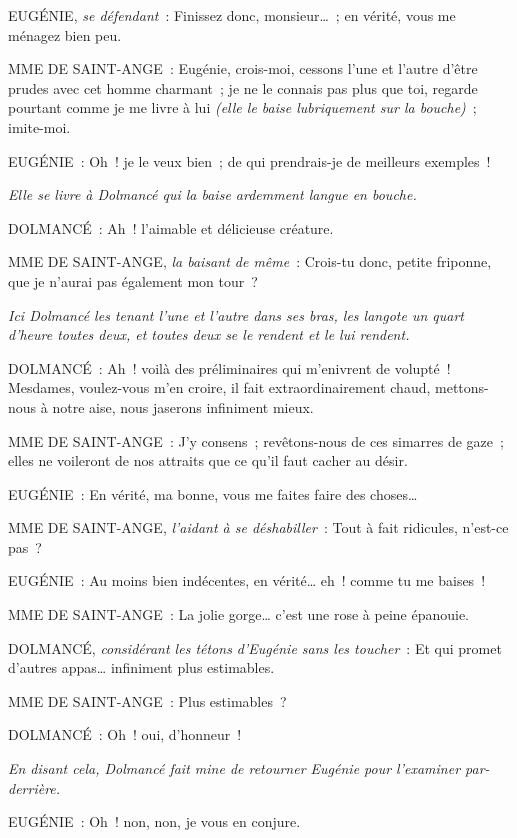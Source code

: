 \documentclass[french,twoside]{book} %
\begin{document}
EUGÉNIE, {\itshape se défendant} : Finissez donc, monsieur… ; en vérité, vous me ménagez bien peu.\par
MME DE SAINT-ANGE : Eugénie, crois-moi, cessons l’une et l’autre d’être prudes avec cet homme charmant ; je ne le connais pas plus que toi, regarde pourtant comme je me livre à lui {\itshape (elle le baise lubriquement sur la bouche)} ; imite-moi.\par
EUGÉNIE : Oh ! je le veux bien ; de qui prendrais-je de meilleurs exemples !\par
{\itshape Elle se livre à Dolmancé qui la baise ardemment langue en bouche.}\par
DOLMANCÉ : Ah ! l’aimable et délicieuse créature.\par
MME DE SAINT-ANGE, {\itshape la baisant de même} : Crois-tu donc, petite friponne, que je n’aurai pas également mon tour ?\par
{\itshape Ici Dolmancé les tenant l’une et l’autre dans ses bras, les langote un quart d’heure toutes deux, et toutes deux se le rendent et le lui rendent. }\par
DOLMANCÉ : Ah ! voilà des préliminaires qui m’enivrent de volupté ! Mesdames, voulez-vous m’en croire, il fait extraordinairement chaud, mettons-nous à notre aise, nous jaserons infiniment mieux.\par
MME DE SAINT-ANGE : J’y consens ; revêtons-nous de ces simarres de gaze ; elles ne voileront de nos attraits que ce qu’il faut cacher au désir.\par
EUGÉNIE : En vérité, ma bonne, vous me faites faire des choses…\par
MME DE SAINT-ANGE, {\itshape l’aidant à se déshabiller} : Tout à fait ridicules, n’est-ce pas ?\par
EUGÉNIE : Au moins bien indécentes, en vérité… eh ! comme tu me baises !\par
MME DE SAINT-ANGE : La jolie gorge… c’est une rose à peine épanouie.\par
DOLMANCÉ, {\itshape considérant les tétons d’Eugénie sans les toucher} : Et qui promet d’autres appas… infiniment plus estimables.\par
MME DE SAINT-ANGE : Plus estimables ?\par
DOLMANCÉ : Oh ! oui, d’honneur !\par
{\itshape En disant cela, Dolmancé fait mine de retourner Eugénie pour l’examiner par-derrière.}\par
EUGÉNIE : Oh ! non, non, je vous en conjure.\par
\end{document}
